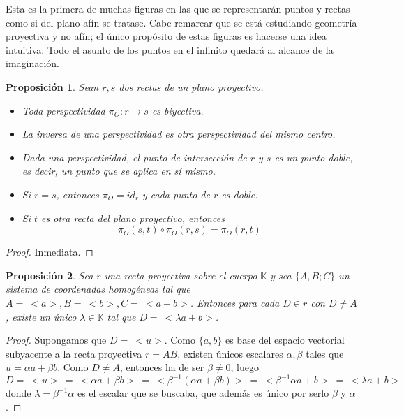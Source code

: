 \documentclass[12pt]{report}
\newtheorem{proposition}{Proposición}[chapter]
\theoremstyle{definition}
\theoremstyle{definition}
\theoremstyle{remark}
\begin{document}
Esta es la primera de muchas figuras en las que se representarán puntos y rectas como si del plano afín se tratase. Cabe remarcar que se está estudiando geometría proyectiva y no afín; el único propósito de estas figuras es hacerse una idea intuitiva. Todo el asunto de los puntos en el infinito quedará al alcance de la imaginación.

\begin{proposition}
\label{prop2.4.}
    Sean $r,s$ dos rectas de un plano proyectivo.
    \begin{itemize}
        \item[(i)] Toda perspectividad $\pi_O \colon r \to s$ es biyectiva.
        \item[(ii)] La inversa de una perspectividad es otra perspectividad del mismo centro.
        \item[(iii)] Dada una perspectividad, el punto de intersección de $r$ y $s$ es un punto doble, es decir, un punto que se aplica en sí mismo.
        \item[(iv)] Si $r = s$, entonces $\pi_O = id_r$ y cada punto de $r$ es doble.
        \item[(v)] Si $t$ es otra recta del plano proyectivo, entonces
        \[\pi_O(s,t) \circ \pi_O(r,s) = \pi_O(r,t)\]
    \end{itemize}
\end{proposition}

\begin{proof}
    Inmediata.
\end{proof}

\begin{proposition}
\label{prop2.5.}
    Sea $r$ una recta proyectiva sobre el cuerpo $\mathbb{K}$ y sea $\{A,B;C\}$ un sistema de coordenadas homogéneas tal que $A = \ <a>, B = \ <b>, C = \ <a+b>$. Entonces para cada $D \in r$ con $D \neq A$, existe un único $\lambda \in \mathbb{K}$ tal que $D = \ <\lambda a +b>$.
\end{proposition}

\begin{proof}
Supongamos que $D = \ <u>$. Como $\{a,b\}$ es base del espacio vectorial subyacente a la recta proyectiva $r = \overline{AB}$, existen únicos escalares $\alpha, \beta$ tales que $u = \alpha a + \beta b$. Como $D \neq A$, entonces ha de ser $\beta \neq 0$, luego
\[D = \ <u> \ = \ <\alpha a +\beta b> \ = \ <\beta^{-1}(\alpha a + \beta b)> \ = \ <\beta^{-1}\alpha a + b> \ = \ <\lambda a + b> \]
donde $\lambda = \beta^{-1}\alpha$ es el escalar que se buscaba, que además es único por serlo $\beta$ y $\alpha$.
\end{proof}
\end{document}
